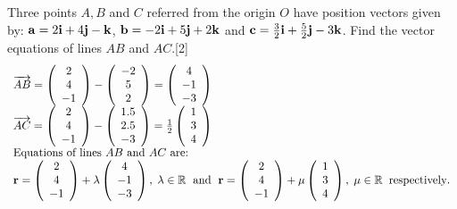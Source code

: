 \documentclass[12pt, a4 paper]{article}
\begin{document}
\begin{outline}[enumerate]
					\1 Three points $A, B$ and $C$ referred from the origin $O$ have position vectors given by:
					${\bf{a}} = 2{\bf{i}} + 4{\bf{j}} - {\bf{k}}$, ${\bf{b}} =  - 2{\bf{i}} + 5{\bf{j}} + 2{\bf{k}}$ and ${\bf{c}} = \frac{3}{2}{\bf{i}} + \frac{5}{2}{\bf{j}} - 3{\bf{k}}$.
					\2 Find the vector equations of lines $AB$ and $AC$.\hfill[2]
					\color{blue}
					\[\begin{array}{l}\overrightarrow {AB}  = \left( {\begin{array}{*{20}{c}}2\\4\\{ - 1}\end{array}} \right) - \left( {\begin{array}{*{20}{c}}{ - 2}\\5\\2\end{array}} \right) = \left( {\begin{array}{*{20}{c}}4\\{ - 1}\\{ - 3}\end{array}} \right)\\\overrightarrow {AC}  = \left( {\begin{array}{*{20}{c}}2\\4\\{ - 1}\end{array}} \right) - \left( {\begin{array}{*{20}{c}}{1.5}\\{2.5}\\{ - 3}\end{array}} \right) = \frac{1}{2}\left( {\begin{array}{*{20}{c}}1\\3\\4\end{array}} \right)\\{\textrm{Equations of lines }}AB{\textrm{ and }}AC{\textrm{ are:}}\\{\bf{r}} = \left( {\begin{array}{*{20}{c}}2\\4\\{ - 1}\end{array}} \right) + \lambda \left( {\begin{array}{*{20}{c}}4\\{ - 1}\\{ - 3}\end{array}} \right),\;\lambda  \in \mathbb{R}{\textrm{ }}\;{\textrm{and}}\;{\textrm{  }}{\bf{r}} = \left( {\begin{array}{*{20}{c}}2\\4\\{ - 1}\end{array}} \right) + \mu \left( {\begin{array}{*{20}{c}}1\\3\\4\end{array}} \right),\;\mu  \in \mathbb{R}\;\;{\textrm{respectively}}{\textrm{.}}\end{array}\]
					\color{black}
																						            

\end{outline}
\end{document}
